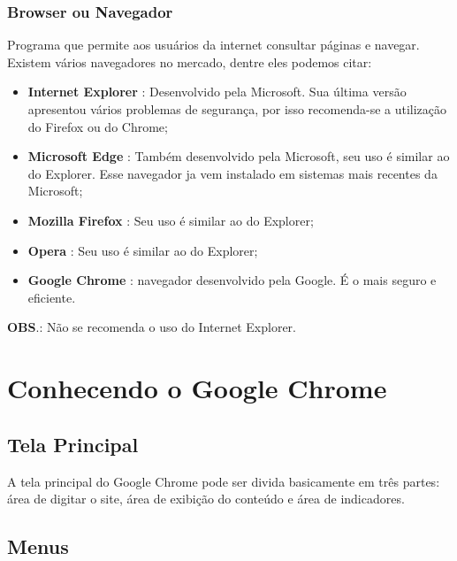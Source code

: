 \documentclass[hidelinks,12pt]{article}
\begin{document}
		\subsubsection{Browser ou Navegador}
		Programa que permite aos usuários da internet consultar páginas e navegar. Existem vários navegadores no mercado, dentre eles podemos citar:
			\begin{itemize}
				\item \textbf{Internet Explorer} : Desenvolvido pela Microsoft. Sua última versão apresentou vários problemas de segurança, por isso recomenda-se a utilização do Firefox ou do Chrome;
				\item \textbf{Microsoft Edge} : Também desenvolvido pela Microsoft, seu uso é similar ao do Explorer. Esse navegador ja vem instalado em sistemas mais recentes da Microsoft;
				\item \textbf{Mozilla Firefox} : Seu uso é similar ao do Explorer;
				\item \textbf{Opera} : Seu uso é similar ao do Explorer;
				\item \textbf{Google Chrome} : navegador desenvolvido pela Google. É o mais seguro e eficiente.
			\end{itemize}
			\textbf{OBS}.: Não se recomenda o uso do Internet Explorer.

		\section{Conhecendo o Google Chrome}
			\subsection{Tela Principal}
			A tela principal do Google Chrome pode ser divida basicamente em três partes: área de digitar o site, área de exibição do conteúdo e área de indicadores.

			\subsection{Menus}
\end{document}
